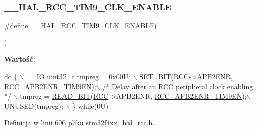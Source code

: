 \subsubsection{\texorpdfstring{\+\_\+\+\_\+\+H\+A\+L\+\_\+\+R\+C\+C\+\_\+\+T\+I\+M9\+\_\+\+C\+L\+K\+\_\+\+E\+N\+A\+B\+LE}{\_\_HAL\_RCC\_TIM9\_CLK\_ENABLE}}
{\footnotesize\ttfamily \#define \+\_\+\+\_\+\+H\+A\+L\+\_\+\+R\+C\+C\+\_\+\+T\+I\+M9\+\_\+\+C\+L\+K\+\_\+\+E\+N\+A\+B\+LE(\begin{DoxyParamCaption}{ }\end{DoxyParamCaption})}

{\bfseries Wartość\+:}
\begin{DoxyCode}
\textcolor{keywordflow}{do} \{ \(\backslash\)
                                        \_\_IO uint32\_t tmpreg = 0x00U; \(\backslash\)
                                        SET\_BIT(\hyperlink{group___peripheral__declaration_ga74944438a086975793d26ae48d5882d4}{RCC}->APB2ENR, 
      \hyperlink{group___peripheral___registers___bits___definition_ga987ebd8255dc8f9c09127e1d608d1065}{RCC\_APB2ENR\_TIM9EN});\(\backslash\)
                                        \textcolor{comment}{/* Delay after an RCC peripheral clock enabling */} \(\backslash\)
                                        tmpreg = \hyperlink{group___exported__macro_ga822bb1bb9710d5f2fa6396b84e583c33}{READ\_BIT}(\hyperlink{group___peripheral__declaration_ga74944438a086975793d26ae48d5882d4}{RCC}->APB2ENR, 
      \hyperlink{group___peripheral___registers___bits___definition_ga987ebd8255dc8f9c09127e1d608d1065}{RCC\_APB2ENR\_TIM9EN});\(\backslash\)
                                        UNUSED(tmpreg); \(\backslash\)
                                          \} \textcolor{keywordflow}{while}(0U)
\end{DoxyCode}


Definicja w linii 606 pliku stm32f4xx\+\_\+hal\+\_\+rcc.\+h.

\mbox{\label{group___r_c_c___a_p_b2___clock___enable___disable_gae0050944298552e9f02f56ec8634f5a6}} 
